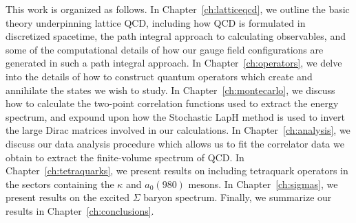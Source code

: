 This work is organized as follows. In Chapter~\ref{ch:latticeqcd}, we outline the basic theory underpinning lattice QCD, including how QCD is formulated in discretized spacetime, the path integral approach to calculating observables, and some of the computational details of how our gauge field configurations are generated in such a path integral approach. In Chapter~\ref{ch:operators}, we delve into the details of how to construct quantum operators which create and annihilate the states we wish to study. In Chapter~\ref{ch:montecarlo}, we discuss how to calculate the two-point correlation functions used to extract the energy spectrum, and expound upon how the Stochastic LapH method is used to invert the large Dirac matrices involved in our calculations. In Chapter~\ref{ch:analysis}, we discuss our data analysis procedure which allows us to fit the correlator data we obtain to extract the finite-volume spectrum of QCD. In Chapter~\ref{ch:tetraquarks}, we present results on including tetraquark operators in the sectors containing the $\kappa$ and $a_0(980)$ mesons. In Chapter~\ref{ch:sigmas}, we present results on the excited $\Sigma$ baryon spectrum. Finally, we summarize our results in Chapter~\ref{ch:conclusions}.